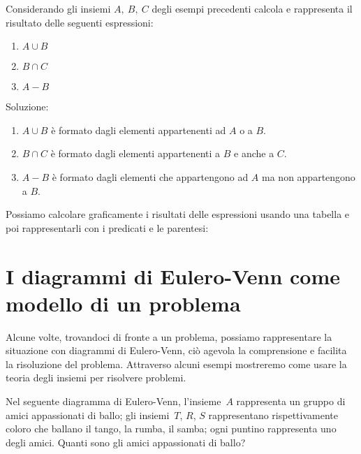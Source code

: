 {\begin{esempio}\label{ese:insiemi_intervalli}
Considerando gli insiemi \(A,~B,~C\) degli esempi precedenti calcola e 
rappresenta il risultato delle seguenti espressioni:
\begin{multicols}{3}
\begin{enumerate} [nosep]
 \item \(A \cup B\)
 \item \(B \cap C\)
 \item \(A - B\)
\end{enumerate}
\end{multicols}
Soluzione:
\begin{enumerate} [nosep]
 \item \(A \cup B\) è formato dagli elementi appartenenti 
 ad \(A\) o a \(B\).
 \item \(B \cap C\) è formato dagli elementi appartenenti 
 a \(B\) e anche a \(C\).
 \item \(A - B\) è formato dagli elementi che appartengono 
 ad \(A\) ma non appartengono a \(B\).
\end{enumerate}
\vspace{1em}
Possiamo calcolare graficamente i risultati delle espressioni usando una 
tabella e poi rappresentarli con i predicati e le parentesi:
\begin{center}
\grafooperazioni
\end{center}
\end{esempio}



\section{I diagrammi di Eulero-Venn come modello di un problema}
\label{sec:insiemi_problemi}

Alcune volte, trovandoci di fronte a un problema, possiamo rappresentare
la situazione con diagrammi di Eulero-Venn, ciò agevola la
comprensione e facilita la risoluzione del problema. Attraverso alcuni
esempi mostreremo come usare la teoria degli insiemi per risolvere
problemi.

 \begin{esempio}
Nel seguente diagramma di Eulero-Venn, l'insieme~\(A\) rappresenta un 
gruppo di 
amici appassionati di ballo; gli insiemi~\(T\), \(R\),
\(S\) rappresentano rispettivamente coloro che ballano il tango, la rumba, 
il samba; ogni puntino rappresenta uno degli amici.
Quanti sono gli amici appassionati di ballo?


\end{esempio}}
